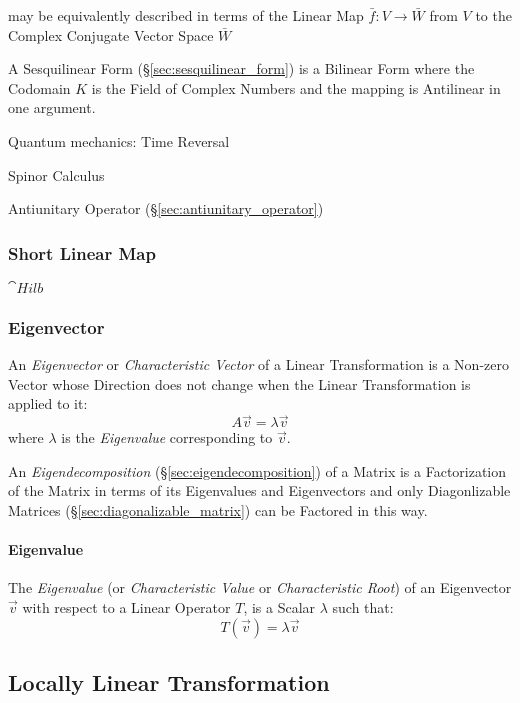 may be equivalently described in terms of the Linear Map $\bar{f} : V
\rightarrow \bar{W}$ from $V$ to the Complex Conjugate Vector Space $\bar{W}$

A Sesquilinear Form (\S\ref{sec:sesquilinear_form}) is a Bilinear Form where
the Codomain $K$ is the Field of Complex Numbers and the mapping is Antilinear
in one argument.


Quantum mechanics: Time Reversal

Spinor Calculus

\fist Antiunitary Operator (\S\ref{sec:antiunitary_operator})



\subsubsection{Short Linear Map}\label{sec:short_linear}

$\cat{Hilb}$



\subsubsection{Eigenvector}\label{sec:eigenvector}

An \emph{Eigenvector} or \emph{Characteristic Vector} of a Linear
Transformation is a Non-zero Vector whose Direction does not change when the
Linear Transformation is applied to it:
\[
  A\vec{v} = \lambda\vec{v}
\]
where $\lambda$ is the \emph{Eigenvalue} corresponding to $\vec{v}$.

An \emph{Eigendecomposition} (\S\ref{sec:eigendecomposition}) of a Matrix is a
Factorization of the Matrix in terms of its Eigenvalues and Eigenvectors and
only Diagonlizable Matrices (\S\ref{sec:diagonalizable_matrix}) can be Factored
in this way.



\paragraph{Eigenvalue}\label{sec:eigenvalue}\hfill

The \emph{Eigenvalue} (or \emph{Characteristic Value} or \emph{Characteristic
  Root}) of an Eigenvector $\vec{v}$ with respect to a Linear Operator $T$, is a
Scalar $\lambda$ such that:
\[
  T(\vec{v}) = \lambda\vec{v}
\]



\subsection{Locally Linear Transformation}\label{sec:locally_linear}


